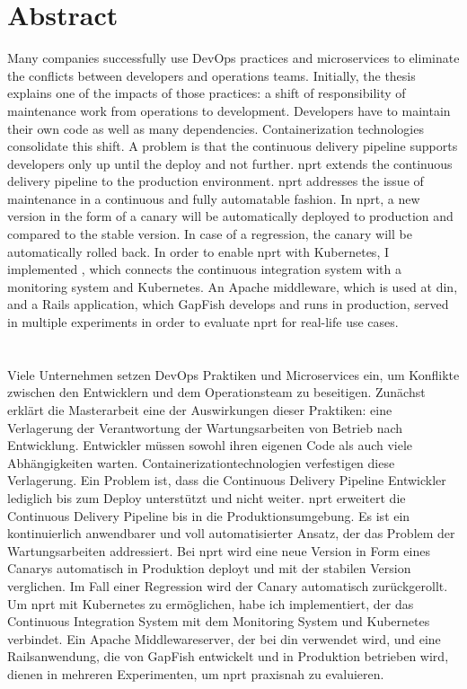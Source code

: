 \section*{Abstract}
Many companies successfully use DevOps practices and microservices to eliminate the
conflicts between developers and operations teams. Initially, the thesis explains one
of the impacts of those practices: a shift of responsibility of maintenance work from
operations to development. Developers have to maintain their own code as well as many
dependencies. Containerization technologies consolidate this shift. A problem is that the
continuous delivery pipeline supports developers only up until the deploy and not
further. \gls{nprt} extends the continuous delivery pipeline to the production
environment. \gls{nprt} addresses the issue of maintenance in a continuous and fully automatable
fashion. In \gls{nprt}, a new version in the form of a canary will be automatically deployed
to production and compared to the stable version. In case of a regression, the canary will
be automatically rolled back. In order to enable \gls{nprt} with Kubernetes, I implemented
\deployer, which connects the continuous integration system with a monitoring system and
Kubernetes. An Apache middleware, which is used at \gls{din}, and a Rails application,
which GapFish develops and runs in production, served in multiple experiments in order to
evaluate \gls{nprt} for real-life use cases.
\\\\\\
Viele Unternehmen setzen DevOps Praktiken und Microservices ein, um Konflikte zwischen den
Entwicklern und dem Operationsteam zu beseitigen. Zu\-nächst erklärt die Masterarbeit eine
der Auswirkungen dieser Praktiken: eine Verlagerung der Verantwortung der Wartungsarbeiten
von Betrieb nach Entwicklung. Entwickler müssen sowohl ihren eigenen Code als auch viele
Abhängigkeiten warten. Containerizationtechnologien verfestigen diese Verlagerung. Ein
Problem ist, dass die Continuous Delivery Pipeline Entwickler lediglich bis zum Deploy
unterstützt und nicht weiter. \gls{nprt} erweitert die Continuous Delivery Pipeline bis in
die Produktionsumgebung. Es ist ein kontinuierlich anwendbarer und voll automatisierter
Ansatz, der das Problem der Wartungsarbeiten addressiert. Bei \gls{nprt} wird eine neue
Version in Form eines Canarys automatisch in Produktion deployt und mit der stabilen
Version verglichen. Im Fall einer Regression wird der Canary automatisch zurückgerollt. Um
\gls{nprt} mit Kubernetes zu ermöglichen, habe ich \deployer implementiert, der das
Continuous Integration System mit dem Monitoring System und Kubernetes verbindet. Ein
Apache Middlewareserver, der bei \gls{din} verwendet wird, und eine Railsanwendung, die
von GapFish entwickelt und in Produktion betrieben wird, dienen in mehreren Experimenten,
um \gls{nprt} praxisnah zu evaluieren.
